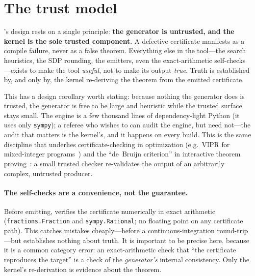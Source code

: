 \section{The trust model}
\label{sec:trust}

\Telperion's design rests on a single principle: \textbf{the generator is
untrusted, and the \Lean{} kernel is the sole trusted component.} A defective
certificate manifests as a compile failure, never as a false theorem. Everything
else in the tool---the search heuristics, the SDP rounding, the emitters, even the
exact-arithmetic self-checks---exists to make the tool \emph{useful}, not to make
its output \emph{true}. Truth is established by, and only by, the kernel
re-deriving the theorem from the emitted certificate.

This has a design corollary worth stating: because nothing the generator does is
trusted, the generator is free to be large and heuristic while the trusted surface
stays small. The engine is a few thousand lines of dependency-light Python (it
uses only \texttt{sympy}); a referee who wishes to can audit the engine, but need
not---the audit that matters is the kernel's, and it happens on every build. This
is the same discipline that underlies certificate-checking in optimization
(e.g.\ VIPR for mixed-integer programs~\cite{vipr}) and the ``de~Bruijn
criterion'' in interactive theorem proving~\cite{debruijn}: a small trusted checker
re-validates the output of an arbitrarily complex, untrusted producer.

\paragraph{The self-checks are a convenience, not the guarantee.} Before emitting,
\Telperion{} verifies the certificate numerically in exact arithmetic
(\texttt{fractions.Fraction} and \texttt{sympy.Rational}; no floating point on any
certificate path). This catches mistakes cheaply---before a continuous-integration
round-trip---but establishes nothing about truth. It is important to be precise
here, because it is a common category error: an exact-arithmetic check that ``the
certificate reproduces the target'' is a check of the \emph{generator's} internal
consistency. Only the kernel's re-derivation is evidence about the theorem.

